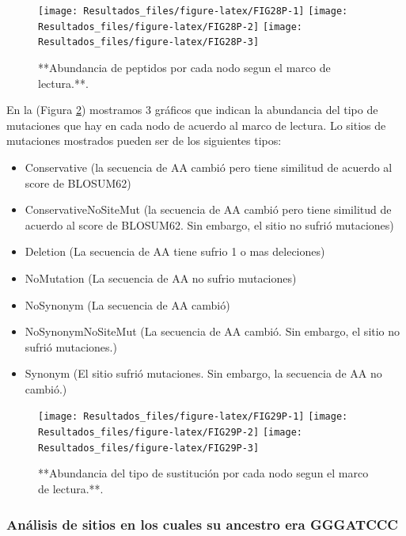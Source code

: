 \documentclass[
]{book}
\providecommand{\tightlist}{%
  \setlength{\itemsep}{0pt}\setlength{\parskip}{0pt}}
\begin{document}
\begin{figure}

{\centering \texttt{[image: Resultados\_files/figure-latex/FIG28P-1]} \texttt{[image: Resultados\_files/figure-latex/FIG28P-2]} \texttt{[image: Resultados\_files/figure-latex/FIG28P-3]} 

}

\caption{**Abundancia de peptidos por cada nodo segun el marco de lectura.**.}\label{fig:FIG28P}
\end{figure}

En la (Figura \ref{fig:FIG29P}) mostramos 3 gráficos que indican la abundancia del tipo de mutaciones que hay en cada nodo de acuerdo al marco de lectura. Lo sitios de mutaciones mostrados pueden ser de los siguientes tipos:

\begin{itemize}
\tightlist
\item
  Conservative (la secuencia de AA cambió pero tiene similitud de acuerdo al score de BLOSUM62)
\item
  ConservativeNoSiteMut (la secuencia de AA cambió pero tiene similitud de acuerdo al score de BLOSUM62. Sin embargo, el sitio no sufrió mutaciones)
\item
  Deletion (La secuencia de AA tiene sufrio 1 o mas deleciones)
\item
  NoMutation (La secuencia de AA no sufrio mutaciones)
\item
  NoSynonym (La secuencia de AA cambió)
\item
  NoSynonymNoSiteMut (La secuencia de AA cambió. Sin embargo, el sitio no sufrió mutaciones.)
\item
  Synonym (El sitio sufrió mutaciones. Sin embargo, la secuencia de AA no cambió.)
\end{itemize}

\begin{figure}

{\centering \texttt{[image: Resultados\_files/figure-latex/FIG29P-1]} \texttt{[image: Resultados\_files/figure-latex/FIG29P-2]} \texttt{[image: Resultados\_files/figure-latex/FIG29P-3]} 

}

\caption{**Abundancia del tipo de sustitución por cada nodo segun el marco de lectura.**.}\label{fig:FIG29P}
\end{figure}

\hypertarget{anuxe1lisis-de-sitios-en-los-cuales-su-ancestro-era-gggatccc}{%
\subsubsection{Análisis de sitios en los cuales su ancestro era GGGATCCC}\label{anuxe1lisis-de-sitios-en-los-cuales-su-ancestro-era-gggatccc}}
\end{document}

